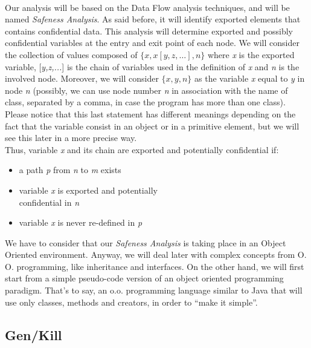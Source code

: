 \documentclass[letterpaper,twocolumn,10pt]{article}
\begin{document}
\paragraph{}
Our analysis will be based on the Data Flow analysis techniques, and will be named \emph{Safeness Analysis}. As said before, it will identify exported elements that contains confidential data. This analysis will determine exported and possibly confidential variables at the entry and exit point of each node. We will consider the collection of values composed of $\{x, x[y, z, \ldots], n\}$ where \emph{x} is the exported variable, [\emph{y,z,...}] is the chain of variables used in the definition of \emph{x} and \emph{n} is the involved node. Moreover, we will consider $\{x, y, n\}$ as the variable \emph{x} equal to \emph{y} in node \emph{n} (possibly, we can use node number \emph{n} in association with the name of class, separated by a comma, in case the program has more than one class). Please notice that this last statement has different meanings depending on the fact that the variable consist in an object or in a primitive element, but we will see this later in a more precise way.\\

Thus, variable \emph{x} and its chain are exported and potentially confidential if:
\begin{itemize}\itemsep2pt \parskip0pt 
\item a path \emph{p} from \emph{n} to \emph{m} exists
\item variable \emph{x} is exported and potentially\\ confidential in \emph{n}
\item variable \emph{x} is never re-defined in \emph{p}
\end{itemize}

We have to consider that our \emph{Safeness Analysis} is taking place in an Object Oriented environment. Anyway, we will deal later with complex concepts from O. O. programming, like inheritance and interfaces. On the other hand, we will first start from a simple pseudo-code version of an object oriented programming paradigm. That's to say, an o.o. programming language similar to Java that will use only classes, methods and creators, in order to ``make it simple''.

\subsection{Gen/Kill}
\end{document}
